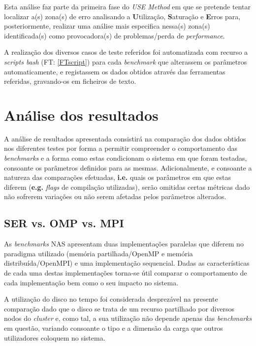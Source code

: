 \documentclass{article}
\begin{document}
Esta análise faz parte da primeira fase do \textit{USE Method} em que se pretende tentar localizar a(s) zona(s) de erro analisando a \textbf{U}tilização, 
\textbf{S}aturação e \textbf{E}rros para, posteriormente, realizar uma análise mais especifica nessa(s) zona(s) identificada(s) como provocadora(s) de 
problemas/perda de \textit{performance}.

A realização dos diversos casos de teste referidos foi automatizada com recurso a \textit{scripts bash} (FT: \ref{FTscript}) para cada \textit{benchmark} 
que alterassem os parâmetros automaticamente, e registassem os dados obtidos através das ferramentas referidas, gravando-os em ficheiros de texto.



\section{Análise dos resultados}

\quad A análise de resultados apresentada consistirá na comparação dos dados obtidos nos diferentes testes por forma a permitir compreender
o comportamento das \textit{benchmarks} e a forma como estas condicionam o sistema em que foram testadas, consoante os parâmetros definidos para as mesmas.
Adicionalmente, e consoante a natureza das comparações efetuadas, \textbf{i.e.} quais os parâmetros em que estas diferem (\textbf{e.g.} 
\textit{flags} de compilação utilizadas), serão omitidas certas métricas dado não sofrerem variações ou não serem afetadas pelos parâmetros
alterados.


\subsection{SER vs. OMP vs. MPI}

\quad As \textit{benchmarks} NAS apresentam duas implementações paralelas que diferem no paradigma utilizado (memória partilhada/OpenMP e memória
distribuída/OpenMPI) e uma implementação sequencial. Dadas as características de cada uma destas implementações torna-se útil comparar o comportamento
de cada implementação bem como o seu impacto no sistema.

A utilização do disco no tempo foi considerada desprezável na presente comparação dado que o disco se trata de um recurso partilhado por diversos nodos
do \textit{cluster} e, como tal, a sua utilização não depende apenas das \textit{benchmarks} em questão, variando consoante o tipo e a dimensão da carga 
que outros utilizadores coloquem no sistema.
\end{document}
